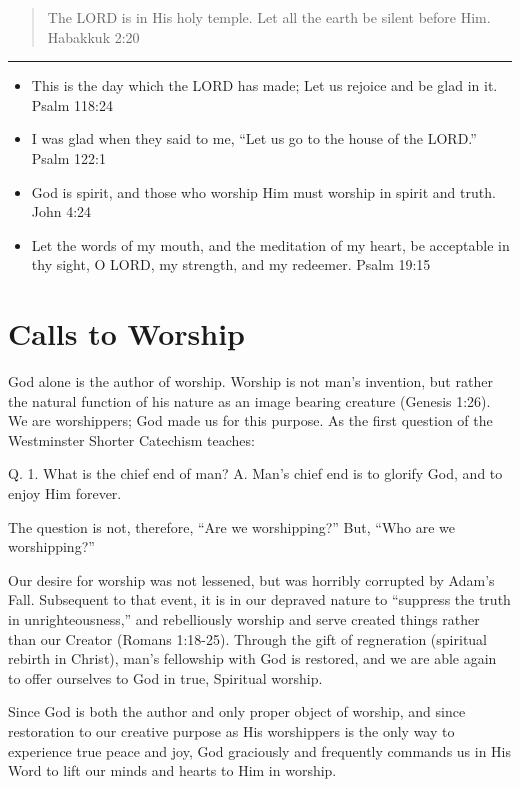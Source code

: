 \documentclass[]{book}
\begin{document}
\begin{quote}
The LORD is in His holy temple. Let all the earth be silent before Him.
\textbar{} Habakkuk 2:20
\end{quote}

\begin{center}\rule{0.5\linewidth}{\linethickness}\end{center}

\begin{itemize}
\item
  This is the day which the LORD has made; Let us rejoice and be glad in
  it. \textbar{} Psalm 118:24
\item
  I was glad when they said to me, ``Let us go to the house of the
  LORD.'' \textbar{} Psalm 122:1
\item
  God is spirit, and those who worship Him must worship in spirit and
  truth. \textbar{} John 4:24
\item
  Let the words of my mouth, and the meditation of my heart, be
  acceptable in thy sight, O LORD, my strength, and my redeemer.
  \textbar{} Psalm 19:15
\end{itemize}

\chapter{Calls to Worship}\label{calls-to-worship}

God alone is the author of worship. Worship is not man's invention, but
rather the natural function of his nature as an image bearing creature
(Genesis 1:26). We are worshippers; God made us for this purpose. As the
first question of the Westminster Shorter Catechism teaches:

Q. 1. What is the chief end of man? A. Man's chief end is to glorify
God, and to enjoy Him forever.

The question is not, therefore, ``Are we worshipping?'' But, ``Who are
we worshipping?''

Our desire for worship was not lessened, but was horribly corrupted by
Adam's Fall. Subsequent to that event, it is in our depraved nature to
``suppress the truth in unrighteousness,'' and rebelliously worship and
serve created things rather than our Creator (Romans 1:18-25). Through
the gift of regneration (spiritual rebirth in Christ), man's fellowship
with God is restored, and we are able again to offer ourselves to God in
true, Spiritual worship.

Since God is both the author and only proper object of worship, and
since restoration to our creative purpose as His worshippers is the only
way to experience true peace and joy, God graciously and frequently
commands us in His Word to lift our minds and hearts to Him in worship.
\end{document}
